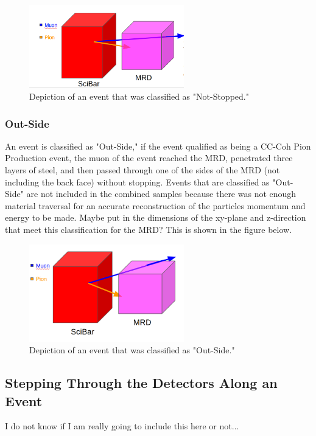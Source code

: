 \documentclass[11pt]{article}
\begin{document}
\begin{figure}[H]
\centering
\includegraphics[width=0.6\textwidth]{EventClassifications/NotStopped.png}
\caption{Depiction of an event that was classified as "Not-Stopped."}
\end{figure}

\subsubsection{Out-Side}
An event is classified as "Out-Side," if the event qualified as being a CC-Coh Pion Production event, the muon of the event reached the MRD, penetrated three layers of steel, and then passed through one of the sides of the MRD (not including the back face) without stopping. Events that are classified as "Out-Side" are not included in the combined samples because there was not enough material traversal for an accurate reconstruction of the particles momentum and energy to be made. Maybe put in the dimensions of the xy-plane and z-direction that meet this classification for the MRD? This is shown in the figure below.

\begin{figure}[H]
\centering
\includegraphics[width=0.6\textwidth]{EventClassifications/OutSide.png}
\caption{Depiction of an event that was classified as "Out-Side."}
\end{figure}

\subsection{Stepping Through the Detectors Along an Event}
I do not know if I am really going to include this here or not...
\end{document}
